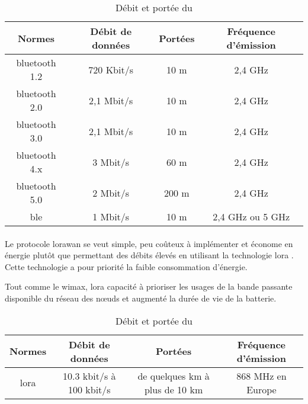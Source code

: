\begin{table}[ht!]
    \centering
    \begin{tabular}{|c|c|c|c|}
        \hline
        \rowcolor{tableColorDark} Normes & Débit de données & Portées & Fréquence d'émission \\
        \hline

        \gls{bluetooth} 1.2              & 720 Kbit/s       & 10 m    & 2,4 GHz              \\\hline
        \gls{bluetooth} 2.0              & 2,1 Mbit/s       & 10 m    & 2,4 GHz              \\\hline
        \gls{bluetooth} 3.0              & 2,1 Mbit/s       & 10 m    & 2,4 GHz              \\\hline
        \gls{bluetooth} 4.x              & 3 Mbit/s         & 60 m    & 2,4 GHz              \\\hline
        \gls{bluetooth} 5.0              & 2 Mbit/s         & 200 m   & 2,4 GHz              \\\hline
        \gls{ble}                        & 1 Mbit/s         & 10 m    & 2,4 GHz ou 5 GHz     \\\hline
    \end{tabular}
    \label{tab:debitPorteeBluetooth}
    \caption{Débit et portée du }
    \nocite{ble}\nocite{debitPortee}
\end{table}

\paragraph{}
\label{sec:lorawan}

Le protocole \gls{lorawan} se veut simple, peu coûteux à implémenter et économe en énergie plutôt que permettant des débits élevés en
utilisant la technologie \gls{lora} \cite{lorawan}. Cette technologie a pour priorité la faible consommation d'énergie.\newline

Tout comme le \gls{wimax}, \gls{lora} capacité à prioriser les usages de la bande passante disponible du
réseau des nœuds et augmenté la durée de vie de la batterie.

\begin{table}[ht!]
    \centering
    \begin{tabular}{|c|c|c|c|}
        \hline
        \rowcolor{tableColorDark} Normes & Débit de données         & Portées                        & Fréquence d'émission \\
        \hline

        \gls{lora}                       & 10.3 kbit/s à 100 kbit/s & de quelques km à plus de 10 km & 868 MHz en Europe    \\\hline
    \end{tabular}
    \label{tab:debitPorteeLora}
    \caption{Débit et portée du }
    \nocite{debitPortee}
\end{table}

